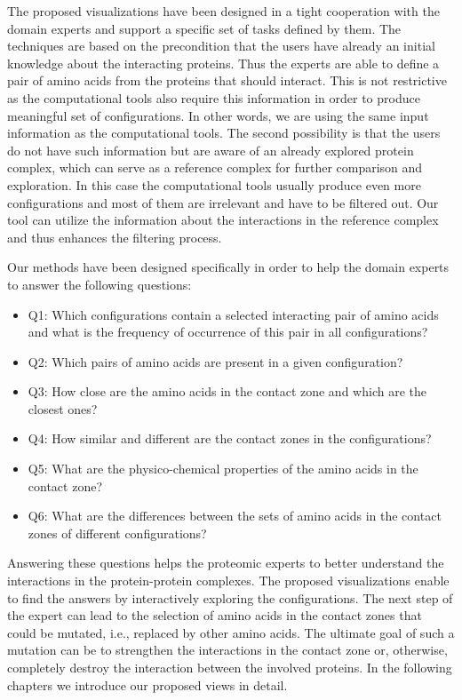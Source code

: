 \documentclass{bmcart}
\begin{document}
The proposed visualizations have been designed in a tight cooperation with the domain experts and support a specific set of tasks defined by them.
The techniques are based on the precondition that the users have already an initial knowledge about the interacting proteins.
Thus the experts are able to define a pair of amino acids from the proteins that should interact.
This is not restrictive as the computational tools also require this information in order to produce meaningful set of configurations. 
In other words, we are using the same input information as the computational tools.
The second possibility is that the users do not have such information but are aware of an already explored protein complex, which can serve as a reference complex for further comparison and exploration. 
In this case the computational tools usually produce even more configurations and most of them are irrelevant and have to be filtered out. 
Our tool can utilize the information about the interactions in the reference complex and thus enhances the filtering process.

Our methods have been designed specifically in order to help the domain experts to answer the following questions:
\begin{itemize}
\item Q1: Which configurations contain a selected interacting pair of amino acids and what is the frequency of occurrence of this pair in all configurations?
\item Q2: Which pairs of amino acids are present in a given configuration?
\item Q3: How close are the amino acids in the contact zone and which are the closest ones?
\item Q4: How similar and different are the contact zones in the configurations?
\item Q5: What are the physico-chemical properties of the amino acids in the contact zone?
\item Q6: What are the differences between the sets of amino acids in the contact zones of different configurations?
\end{itemize}

Answering these questions helps the proteomic experts to better understand the interactions in the protein-protein complexes.
The proposed visualizations enable to find the answers by interactively exploring the configurations.
The next step of the expert can lead to the selection of amino acids in the contact zones that could be mutated, i.e., replaced by other amino acids.
The ultimate goal of such a mutation can be to strengthen the interactions in the contact zone or, otherwise, completely destroy the interaction between the involved proteins. 
In the following chapters we introduce our proposed views in detail.
\end{document}
